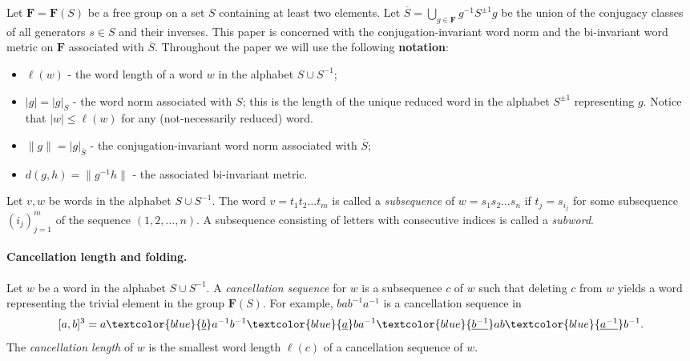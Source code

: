 \documentclass[12pt,reqno,a4paper]{article}
\theoremstyle{definition}
\theoremstyle{remark}
\numberwithin{equation}{section}
\numberwithin{figure}{section}
\newcommand{\B}[1]{{\mathbf #1}}
\begin{document}
Let $\B F= \B F(S)$ be a free group on a set $S$ containing at least two elements. 
Let $\overline{S} = \bigcup_{g\in \B F}g^{-1}S^{\pm 1}g$ be the union of the
conjugacy classes of all generators $s\in S$ and their inverses.
This paper is concerned with the conjugation-invariant word norm and
the bi-invariant word metric on $\B F$ associated with $\overline{S}$. 
Throughout the paper we will use the following {\bf notation}:
\begin{itemize}
\item $\ell(w)$ - the word length of a word $w$ in the alphabet $S\cup S^{-1}$;
\item $|g|=|g|_S$ - the word norm associated with $S$; 
this is the length of the unique reduced word in the alphabet $S^{\pm 1}$ representing $g$. Notice that $|w| \leq \ell(w)$ for any (not-necessarily reduced) word.
\item $\|g\|= |g|_{\overline{S}}$ - the conjugation-invariant word norm associated with $\overline{S}$;
\item $d(g,h) = \|g^{-1}h\|$ - the associated bi-invariant metric.
\end{itemize}
Let $v,w$ be words in the alphabet $S\cup S^{-1}$. The word $v=t_1t_2\dots t_m$ is called
a {\em subsequence} of $w=s_1s_2 \dots s_n$ if $t_j = s_{i_j}$ for some 
subsequence $(i_j)_{j=1}^m$ of the sequence $(1,2,\ldots,n)$. A subsequence
consisting of letters with consecutive indices is called a {\em subword}.




\paragraph{Cancellation length and folding.}\label{PA:cancel}
Let $w$ be a word in the alphabet $S\cup S^{-1}$. A {\em cancellation sequence}
for $w$ is a subsequence $c$ of $w$ such that deleting $c$ from $w$ yields a word
representing the trivial element in the group $\B F(S)$.  For example,
$bab^{-1}a^{-1}$ is a cancellation sequence in
$$
[a,b]^3 = 
a{\textcolor{blue}{\underline{b}}}
a^{-1}b^{-1}\textcolor{blue}{\underline{a}}
ba^{-1}{\textcolor{blue}{\underline{b^{-1}}}}
ab\textcolor{blue}{\underline{a^{-1}}}
b^{-1}.
$$
The {\em cancellation length} of $w$ is the smallest word length $\ell(c)$ of a cancellation sequence of $w$.
\end{document}
